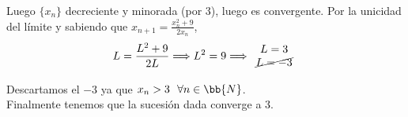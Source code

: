 \documentclass[12pt]{article}
\begin{document}
\begin{ejercicio}[4 puntos]
\begin{enumerate}
            Luego $\{x_n\}$ decreciente y minorada (por 3), luego es convergente. Por la unicidad del límite y sabiendo que $x_{n+1}=\frac{x_n^2 + 9}{2x_n}$,
            \begin{gather*}
                L=\dfrac{L^2 + 9}{2L} \Longrightarrow L^2 = 9 \Longrightarrow \begin{array}{c}
                     L=3 \\
                     \cancel{L=-3}
                \end{array}
            \end{gather*}

            Descartamos el $-3$ ya que $x_n>3\ \ \forall n \in \bb{N}$.\\
            Finalmente tenemos que la sucesión dada converge a 3.
        \end{enumerate}
        
    \end{ejercicio}


     
\end{document}
